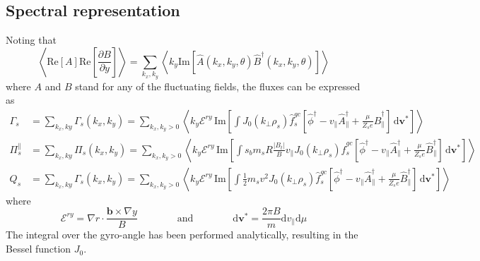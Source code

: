 \documentclass[a4paper]{report}
\begin{document}
\subsection{Spectral representation}
Noting that 
\begin{equation*}
\left< \textrm{Re}\left[ A \right] \textrm{Re}\left[\frac{\partial B}{\partial y}\right]\right>  = \sum_{k_x,k_y}\left<   k_y \textrm{Im}\left[\hat{A}(k_x,k_y,\theta)\hat{B}^\dagger(k_x,k_y,\theta)\right] \right>  
\end{equation*}
where $A$ and $B$ stand for any of the fluctuating fields, the fluxes can be expressed as
\begin{align*}
\Gamma_s & = \sum_{k_x,ky} \Gamma_s(k_x,k_y) = \sum_{k_x,k_y>0}  \left<k_y\mathcal{E}^{ry} \,\textrm{Im}\left[ \int J_0(k_\perp\rho_s)\hat{f}_s^{gc}\left[\hat{\phi}^\dagger-v_\parallel \hat{A}_\parallel^\dagger + \frac{\mu}{Z_s e}\hat{B}_\parallel^\dagger\right] 
 \,\textrm{d}\mathbf{v^*}\right]\right>\\
\Pi^\parallel_s & = \sum_{k_x,ky} \Pi_s(k_x,k_y) =  \sum_{k_x,k_y>0}  \left<k_y\mathcal{E}^{ry} \,\textrm{Im}\left[ \int s_bm_sR\frac{|B_t|}{B}v_\parallel J_0(k_\perp\rho_s)\hat{f}_s^{gc}\left[\hat{\phi}^\dagger-v_\parallel \hat{A}_\parallel^\dagger + \frac{\mu}{Z_s e}\hat{B}_\parallel^\dagger\right] 
\,\textrm{d}\mathbf{v^*}\right]\right> \\
Q_s & = \sum_{k_x,ky} \Gamma_s(k_x,k_y) = \sum_{k_x,k_y>0}  \left<k_y\mathcal{E}^{ry} \,\textrm{Im}\left[\int \frac{1}{2}m_sv^2 J_0(k_\perp\rho_s)\hat{f}_s^{gc}\left[\hat{\phi}^\dagger-v_\parallel \hat{A}_\parallel^\dagger + \frac{\mu}{Z_s e}\hat{B}_\parallel^\dagger\right] 
\,\textrm{d}\mathbf{v^*}\right]\right>
\end{align*}
where 
\begin{equation*}
\mathcal{E}^{ry}= \nabla r \cdot \frac{\mathbf{b}\times \nabla y}{B} \qquad \qquad \textrm{and} \qquad \qquad \textrm{d}\mathbf{v^*}=\frac{2\pi B}{m}\textrm{d}v_\parallel\textrm{d}\mu
\end{equation*}
The integral over the gyro-angle has been performed analytically, resulting in the Bessel function $J_0$. 
\end{document}
